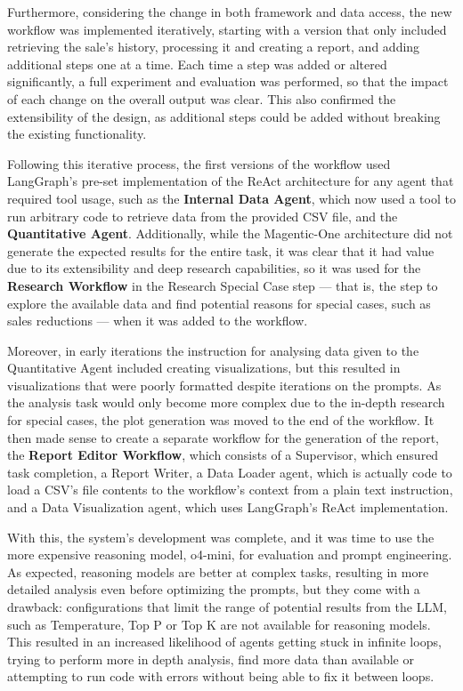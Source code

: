 \documentclass[a4paper]{report}
\begin{document}
Furthermore, considering the change in both framework and data access, the new workflow was implemented iteratively, starting with a version that only included retrieving the sale's history, processing it and creating a report, and adding additional steps one at a time. Each time a step was added or altered significantly, a full experiment and evaluation was performed, so that the impact of each change on the overall output was clear. This also confirmed the extensibility of the design, as additional steps could be added without breaking the existing functionality.

Following this iterative process, the first versions of the workflow used LangGraph's pre-set implementation of the ReAct architecture for any agent that required tool usage, such as the \textbf{Internal Data Agent}, which now used a tool to run arbitrary code to retrieve data from the provided CSV file, and the \textbf{Quantitative Agent}. Additionally, while the Magentic-One architecture did not generate the expected results for the entire task, it was clear that it had value due to its extensibility and deep research capabilities, so it was used for the \textbf{Research Workflow} in the Research Special Case step --- that is, the step to explore the available data and find potential reasons for special cases, such as sales reductions --- when it was added to the workflow.

Moreover, in early iterations the instruction for analysing data given to the Quantitative Agent included creating visualizations, but this resulted in visualizations that were poorly formatted despite iterations on the prompts. As the analysis task would only become more complex due to the in-depth research for special cases, the plot generation was moved to the end of the workflow. It then made sense to create a separate workflow for the generation of the report, the \textbf{Report Editor Workflow}, which consists of a Supervisor, which ensured task completion, a Report Writer, a Data Loader agent, which is actually code to load a CSV's file contents to the workflow's context from a plain text instruction, and a Data Visualization agent, which uses LangGraph's ReAct implementation.

With this, the system's development was complete, and it was time to use the more expensive reasoning model, o4-mini, for evaluation and prompt engineering. As expected, reasoning models are better at complex tasks, resulting in more detailed analysis even before optimizing the prompts, but they come with a drawback: configurations that limit the range of potential results from the LLM, such as Temperature, Top P or Top K are not available for reasoning models. This resulted in an increased likelihood of agents getting stuck in infinite loops, trying to perform more in depth analysis, find more data than available or attempting to run code with errors without being able to fix it between loops.
\end{document}
